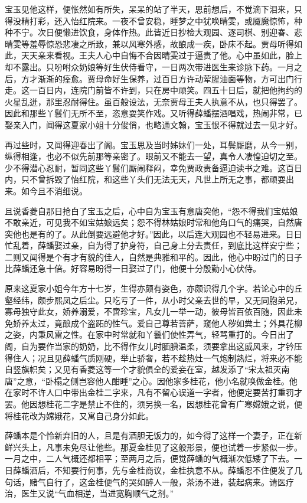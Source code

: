 宝玉见他这样，便怅然如有所失，呆呆的站了半天，思前想后，不觉滴下泪来，只得没精打彩，还入怡红院来。一夜不曾安稳，睡梦之中犹唤晴雯，或魇魔惊怖，种种不宁。次日便懒进饮食，身体作热。此皆近日抄检大观园、逐司棋、别迎春、悲晴雯等羞辱惊恐悲凄之所致，兼以风寒外感，故酿成一疾，卧床不起。贾母听得如此，天天亲来看视。王夫人心中自悔不合因晴雯过于逼责了他。心中虽如此，脸上却不露出。只吩咐众奶娘等好生伏侍看守，一日两次带进医生来诊脉下药。一月之后，方才渐渐的痊愈。贾母命好生保养，过百日方许动荤腥油面等物，方可出门行走。这一百日内，连院门前皆不许到，只在房中顽笑。四五十日后，就把他拘约的火星乱迸，那里忍耐得住。虽百般设法，无奈贾母王夫人执意不从，也只得罢了。因此和那些丫鬟们无所不至，恣意耍笑作戏。又听得薛蟠摆酒唱戏，热闹非常，已娶亲入门，闻得这夏家小姐十分俊俏，也略通文翰，宝玉恨不得就过去一见才好。

再过些时，又闻得迎春出了阁。宝玉思及当时姊妹们一处，耳鬓厮磨，从今一别，纵得相逢，也必不似先前那等亲密了。眼前又不能去一望，真令人凄惶迫切之至。少不得潜心忍耐，暂同这些丫鬟们厮闹释闷，幸免贾政责备逼迫读书之难。这百日内，只不曾拆毁了怡红院，和这些丫头们无法无天，凡世上所无之事，都顽耍出来。如今且不消细说。

且说香菱自那日抢白了宝玉之后，心中自为宝玉有意唐突他，“怨不得我们宝姑娘不敢亲近，可见我不如宝姑娘远矣；怨不得林姑娘时常和他角口气的痛哭，自然唐突他也是有的了。从此倒要远避他才好。”因此，以后连大观园也不轻易进来。日日忙乱着，薛蟠娶过亲，自为得了护身符，自己身上分去责任，到底比这样安宁些；二则又闻得是个有才有貌的佳人，自然是典雅和平的。因此，他心中盼过门的日子比薛蟠还急十倍。好容易盼得一日娶过了门，他便十分殷勤小心伏侍。

原来这夏家小姐今年方十七岁，生得亦颇有姿色，亦颇识得几个字。若论心中的丘壑经纬，颇步熙凤之后尘。只吃亏了一件，从小时父亲去世的早，又无同胞弟兄，寡母独守此女，娇养溺爱，不啻珍宝，凡女儿一举一动，彼母皆百依百随，因此未免娇养太过，竟酿成个盗跖的性气。爱自己尊若菩萨，窥他人秽如粪土；外具花柳之姿，内秉风雷之性。在家中时常就和丫鬟们使性弄气，轻骂重打的。今日出了阁，自为要作当家的奶奶，比不得作女儿时腼腆温柔，须要拿出这威风来，才钤压得住人；况且见薛蟠气质刚硬，举止骄奢，若不趁热灶一气炮制熟烂，将来必不能自竖旗帜矣；又见有香菱这等一个才貌俱全的爱妾在室，越发添了“宋太祖灭南唐”之意，“卧榻之侧岂容他人酣睡”之心。因他家多桂花，他小名就唤做金桂。他在家时不许人口中带出金桂二字来，凡有不留心误道一字者，他便定要苦打重罚才罢。他因想桂花二字是禁止不住的，须另换一名，因想桂花曾有广寒嫦娥之说，便将桂花改为嫦娥花，又寓自己身分如此。

薛蟠本是个怜新弃旧的人，且是有酒胆无饭力的，如今得了这样一个妻子，正在新鲜兴头上，凡事未免尽让他些。那夏金桂见了这般形景，便也试着一步紧似一步。一月之中，二人气概还都相平；至两月之后，便觉薛蟠的气概渐次低矮了下去。一日薛蟠酒后，不知要行何事，先与金桂商议，金桂执意不从。薛蟠忍不住便发了几句话，赌气自行了，这金桂便气的哭如醉人一般，茶汤不进，装起病来。请医疗治，医生又说“气血相逆，当进宽胸顺气之剂。”

